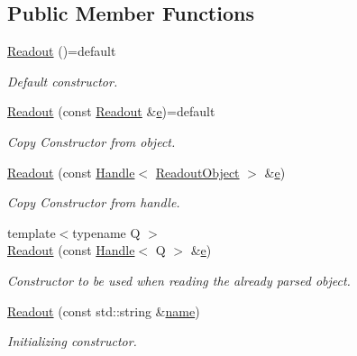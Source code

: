 \subsection*{Public Member Functions}
\begin{DoxyCompactItemize}
\item 
\hyperlink{class_d_d4hep_1_1_geometry_1_1_readout_a494549d8bcb34fda8d23c46701050f76}{Readout} ()=default
\begin{DoxyCompactList}\small\item\em Default constructor. \end{DoxyCompactList}\item 
\hyperlink{class_d_d4hep_1_1_geometry_1_1_readout_a669240d429dfede4a33fc6110277904c}{Readout} (const \hyperlink{class_d_d4hep_1_1_geometry_1_1_readout}{Readout} \&\hyperlink{_volumes_8cpp_a8a9a1f93e9b09afccaec215310e64142}{e})=default
\begin{DoxyCompactList}\small\item\em Copy Constructor from object. \end{DoxyCompactList}\item 
\hyperlink{class_d_d4hep_1_1_geometry_1_1_readout_a6bfb91ac432f9ee6ed1b08921188a87a}{Readout} (const \hyperlink{class_d_d4hep_1_1_handle}{Handle}$<$ \hyperlink{class_d_d4hep_1_1_geometry_1_1_readout_object}{Readout\+Object} $>$ \&\hyperlink{_volumes_8cpp_a8a9a1f93e9b09afccaec215310e64142}{e})
\begin{DoxyCompactList}\small\item\em Copy Constructor from handle. \end{DoxyCompactList}\item 
{\footnotesize template$<$typename Q $>$ }\\\hyperlink{class_d_d4hep_1_1_geometry_1_1_readout_a604b89528c99c775beb5931470280c30}{Readout} (const \hyperlink{class_d_d4hep_1_1_handle}{Handle}$<$ Q $>$ \&\hyperlink{_volumes_8cpp_a8a9a1f93e9b09afccaec215310e64142}{e})
\begin{DoxyCompactList}\small\item\em Constructor to be used when reading the already parsed object. \end{DoxyCompactList}\item 
\hyperlink{class_d_d4hep_1_1_geometry_1_1_readout_af244b9f3e7ac53e9a69495cabc7eea31}{Readout} (const std\+::string \&\hyperlink{class_d_d4hep_1_1_handle_a27c7d467a609ab32c133e1f3c7d85ef5}{name})
\begin{DoxyCompactList}\small\item\em Initializing constructor. \end{DoxyCompactList}\item 

\end{DoxyCompactItemize}
